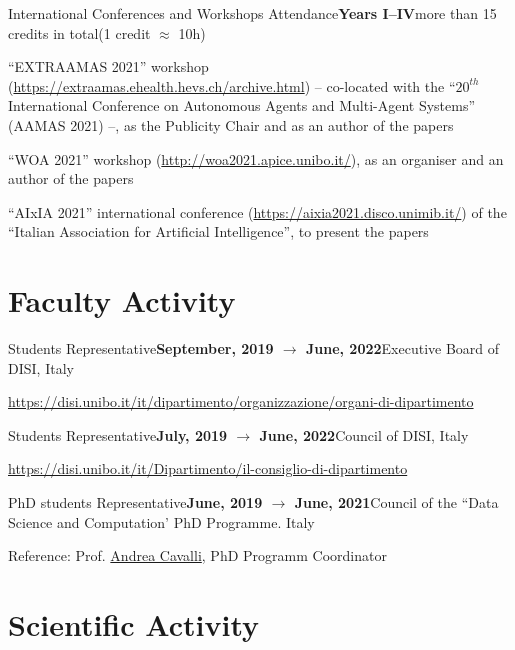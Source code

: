 \begin{activity}{International Conferences and Workshops Attendance}{\textbf{Years I--IV}}{more than 15 credits in total}{(1 credit $\approx$ 10h)}
    \item ``EXTRAAMAS 2021'' workshop (\url{https://extraamas.ehealth.hevs.ch/archive.html}) -- co-located with the ``$20^{th}$ International Conference on Autonomous Agents and Multi-Agent Systems'' (AAMAS 2021) --, as the Publicity Chair and as an author of the papers \cite{imagination-extraamas2021,shallow2deep-extraamas2021,gridex-extraamas2021}
    \item ``WOA 2021'' workshop (\url{http://woa2021.apice.unibo.it/}), as an organiser and an author of the papers \cite{psyke-woa2021,gnn-woa2021}
    \item ``AIxIA 2021'' international conference (\url{https://aixia2021.disco.unimib.it/}) of the ``Italian Association for Artificial Intelligence'', to present the papers \cite{dcc-aixia-2021-plp}
\end{activity}

\section*{Faculty Activity}

\begin{activity}{Students Representative}{\textbf{September, 2019 $\rightarrow$ June, 2022}}{Executive Board of DISI}{\uniboen, Italy}
    \item \url{https://disi.unibo.it/it/dipartimento/organizzazione/organi-di-dipartimento}
\end{activity}

\begin{activity}{Students Representative}{\textbf{July, 2019 $\rightarrow$ June, 2022}}{Council of DISI}{\uniboen, Italy}
    \item \url{https://disi.unibo.it/it/Dipartimento/il-consiglio-di-dipartimento}
\end{activity}

\begin{activity}{PhD students Representative}{\textbf{June, 2019 $\rightarrow$ June, 2021}}{Council of the ``Data Science and Computation' PhD Programme}{\uniboen. Italy}
    \item Reference: Prof. \href{mailto:andrea.cavalli@unibo.it}{Andrea Cavalli}, PhD Programm Coordinator
\end{activity}


\section*{Scientific Activity}

